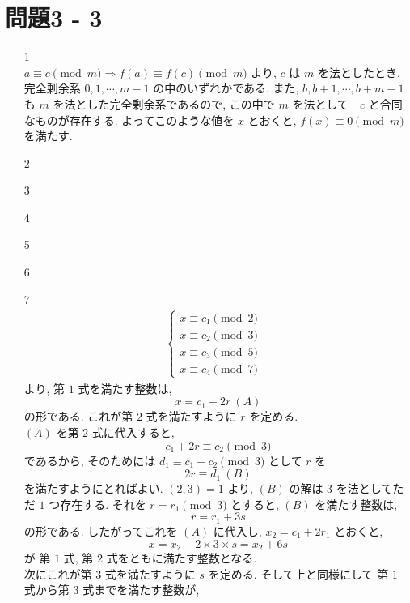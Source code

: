 \documentclass[12pt,a4paper]{jsarticle}
\begin{document}
\section*{問題3 - 3}
\begin{enumerate}
 \item[1]  \mbox{} \\
	$a \equiv c \pmod{m} \Rightarrow f(a) \equiv f(c) \pmod{m}$
	より, $c$ は $m$ を法としたとき, 完全剰余系 $0, 1, \cdots , m-1$ の中のいずれかである. 		また, $b, b+1, \cdots, b+m-1$ も $m$ を法とした完全剰余系であるので, この中で $m$ を法として　$c$ と合同なものが存在する. よってこのような値を $x$ とおくと, $f(x) \equiv 0 \pmod{m}$ を満たす. 
\item[2]  \mbox{} \\
 \item[3]  \mbox{} \\
 \item[4]  \mbox{} \\
 \item[5]  \mbox{} \\
 \item[6]  \mbox{} \\
 \item[7]  \mbox{} \\
 \begin{align*}
  \begin{cases}
  x \equiv c_1 \pmod{2} & \\
  x \equiv c_2 \pmod{3} & \\
  x \equiv c_3 \pmod{5} & \\
  x \equiv c_4 \pmod{7}
  \end{cases}
 \end{align*}
 より, 第 $1$ 式を満たす整数は,
 \[ x = c_1 + 2r~ (A) \]
 の形である. これが第 $2$ 式を満たすように $r$ を定める. \\
 $(A)$ を第 $2$ 式に代入すると,
 \[ c_1 + 2r \equiv c_2 \pmod{3} \] 
 であるから, そのためには $d_1 \equiv c_1 - c_2 \pmod{3}$ として $r$ を
 \[ 2r \equiv d_1~ (B) \]
 を満たすようにとればよい. $(2, 3) = 1$ より, $(B)$ の解は $3$ を法としてただ $1$ つ存在する. それを $r = r_1 \pmod{3}$ とすると, $(B)$ を満たす整数は,
 \[ r = r_1 + 3s \]
 の形である. したがってこれを $(A)$ に代入し, $x_2 = c_1 + 2r_1$ とおくと,
 \[ x = x_2 + 2 \times 3 \times s = x_2 + 6s \]
 が 第 $1$ 式, 第 $2$ 式をともに満たす整数となる. \\
 次にこれが第 $3$ 式を満たすように $s$ を定める. そして上と同様にして 第 $1$ 式から第 $3$ 式までを満たす整数が, 

\end{enumerate}
\end{document}
